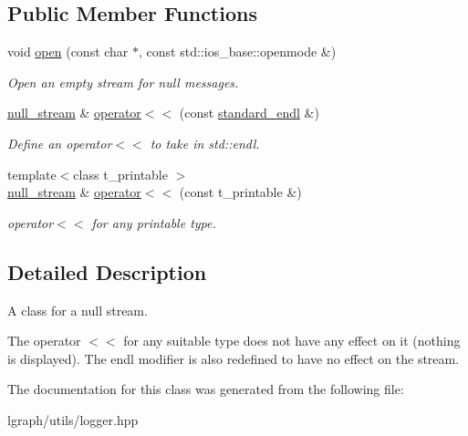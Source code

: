 \subsection*{Public Member Functions}
\begin{DoxyCompactItemize}
\item 
\mbox{\label{classlgraph_1_1utils_1_1null__stream_a4b1d2687e779efef7d4995bcede83448}} 
void \hyperlink{classlgraph_1_1utils_1_1null__stream_a4b1d2687e779efef7d4995bcede83448}{open} (const char $\ast$, const std\+::ios\+\_\+base\+::openmode \&)
\begin{DoxyCompactList}\small\item\em Open an empty stream for null messages. \end{DoxyCompactList}\item 
\mbox{\label{classlgraph_1_1utils_1_1null__stream_a6dd6b8cde39e03fe63eb2feef89ebc11}} 
\hyperlink{classlgraph_1_1utils_1_1null__stream}{null\+\_\+stream} \& \hyperlink{classlgraph_1_1utils_1_1null__stream_a6dd6b8cde39e03fe63eb2feef89ebc11}{operator$<$$<$} (const \hyperlink{classlgraph_1_1utils_1_1null__stream_ada7be393792a0f7b90452c981a279d08}{standard\+\_\+endl} \&)
\begin{DoxyCompactList}\small\item\em Define an operator$<$$<$ to take in std\+::endl. \end{DoxyCompactList}\item 
\mbox{\label{classlgraph_1_1utils_1_1null__stream_a633f62bff5dd6e4973674d2f109732cf}} 
{\footnotesize template$<$class t\+\_\+printable $>$ }\\\hyperlink{classlgraph_1_1utils_1_1null__stream}{null\+\_\+stream} \& \hyperlink{classlgraph_1_1utils_1_1null__stream_a633f62bff5dd6e4973674d2f109732cf}{operator$<$$<$} (const t\+\_\+printable \&)
\begin{DoxyCompactList}\small\item\em operator$<$$<$ for any printable type. \end{DoxyCompactList}\end{DoxyCompactItemize}


\subsection{Detailed Description}
A class for a null stream. 

The operator \textquotesingle{}$<$$<$\textquotesingle{} for any suitable type does not have any effect on it (nothing is displayed). The \textquotesingle{}endl\textquotesingle{} modifier is also redefined to have no effect on the stream. 

The documentation for this class was generated from the following file\+:\begin{DoxyCompactItemize}
\item 
lgraph/utils/logger.\+hpp\end{DoxyCompactItemize}
